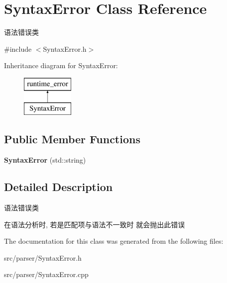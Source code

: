 \hypertarget{class_syntax_error}{}\section{Syntax\+Error Class Reference}
\label{class_syntax_error}


语法错误类  




{\ttfamily \#include $<$Syntax\+Error.\+h$>$}

Inheritance diagram for Syntax\+Error\+:\begin{figure}[H]
\begin{center}
\leavevmode
\includegraphics[height=2.000000cm]{class_syntax_error}
\end{center}
\end{figure}
\subsection*{Public Member Functions}
\begin{DoxyCompactItemize}
\item 
\mbox{\label{class_syntax_error_a41285cf1cafd071040aec4382e0d7dcd}} 
{\bfseries Syntax\+Error} (std\+::string)
\end{DoxyCompactItemize}


\subsection{Detailed Description}
语法错误类 

在语法分析时, 若是匹配项与语法不一致时 就会抛出此错误 

The documentation for this class was generated from the following files\+:\begin{DoxyCompactItemize}
\item 
src/parser/Syntax\+Error.\+h\item 
src/parser/Syntax\+Error.\+cpp\end{DoxyCompactItemize}
